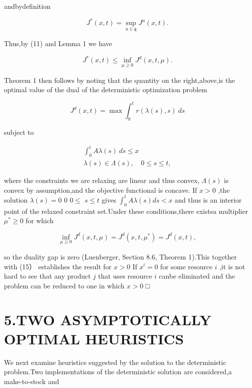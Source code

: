 andbydefinition

\[
J ^ { * } ( x , t ) = \operatorname* { s u p } _ { u \in \mathfrak { q } } J ^ { u } ( x , t ) .
\]

Thus,by (11) and Lemma 1 we have

\[
J ^ { * } ( x , t ) \leqslant \underset { \mu \geqslant 0 } { \operatorname* { i n f } } J ^ { d } ( x , t , \mu ) .
\]

Theorem 1 then follows by noting that the quantity on the right,above,is
the optimal value of the dual of the deterministic optimization problem

\[
J ^ { d } ( x , t ) = \operatorname* { m a x } \int _ { 0 } ^ { t } r ( \lambda ( s ) , s ) \ d s
\]

subject to

\[
\begin{array} { l } { \displaystyle \int _ { 0 } ^ { t } { A \lambda ( s ) ~ d s } \leqslant x } \\ { \displaystyle \lambda ( s ) \in \Lambda ( s ) , \quad 0 \leqslant s \leqslant t , } \end{array}
\]

where the constraints we are relaxing are linear and thus convex,
\(\Lambda ( s )\) is convex by assumption,and the objective functional
is concave. If \(x > 0\) ,the solution \(\lambda ( s ) = 0\) 0
\(0 \leqslant\) \(s \leqslant t\) gives
\(\textstyle \int _ { 0 } ^ { t } A \lambda ( s ) d s < x\) and thus is
an interior point of the relaxed constraint set.Under these
conditions,there existsa multiplier \(\mu ^ { * } \geqslant 0\) for
which

\[
\operatorname* { i n f } _ { \mu \geqslant 0 } J ^ { d } ( x , t , \mu ) = J ^ { d } ( x , t , \mu ^ { \ast } ) = J ^ { d } ( x , t ) ,
\]

so the duality gap is zero (Luenberger, Section 8.6, Theorem 1).This
together with (15） establishes the result for \(x > 0\) If
\(x ^ { i } = 0\) for some resource \(i\) ,it is not hard to see that
any product \(j\) that uses resource \(i\) canbe eliminated and the
problem can be reduced to one in which \(x > 0\) □

\section{5.TWO ASYMPTOTICALLY OPTIMAL
HEURISTICS}\label{two-asymptotically-optimal-heuristics}

We next examine heuristics suggested by the solution to the
deterministic problem.Two implementations of the deterministic solution
are considered,a make-to-stock and

